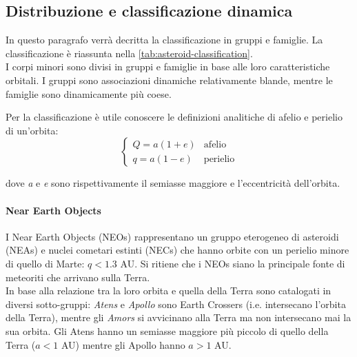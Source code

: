 \documentclass[a4paper,11pt,openright]{book}
\begin{document}
\subsection{Distribuzione e classificazione dinamica}
In questo paragrafo verrà decritta la classificazione in gruppi e famiglie.
La classificazione è riassunta nella \cref{tab:asteroid-classification}.\\
I corpi minori sono divisi in gruppi e famiglie in base alle loro caratteristiche orbitali. 
I gruppi sono associazioni dinamiche relativamente blande, mentre le famiglie sono dinamicamente più coese.

Per la classificazione è utile conoscere le definizioni analitiche di afelio e perielio di un'orbita:
\begin{equation}
    \begin{cases}
        Q=a(1+e) &\text{afelio}\\
        q=a(1-e) &\text{perielio}
    \end{cases}
\end{equation}

dove \textit{a} e \textit{e} sono rispettivamente il semiasse maggiore e l'eccentricità dell'orbita.

\paragraph*{Near Earth Objects}\label{sec:neo}
I Near Earth Objects (NEOs) rappresentano un gruppo eterogeneo di asteroidi (NEAs) e nuclei cometari estinti (NECs) che hanno orbite con un perielio minore di quello di Marte: $q<1.3$ AU. Si ritiene che i NEOs siano la principale fonte di meteoriti che arrivano sulla Terra.\\
In base alla relazione tra la loro orbita e quella della Terra sono catalogati in diversi sotto-gruppi: \textit{Atens} e \textit{Apollo} sono Earth Crossers (i.e. intersecano l’orbita della Terra), mentre gli \textit{Amors} si avvicinano alla Terra ma non intersecano mai la sua orbita. Gli Atens hanno un semiasse maggiore più piccolo di quello della Terra ($a<1$ AU) mentre gli Apollo hanno $a>1$ AU.
\end{document}
